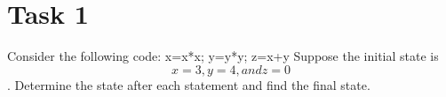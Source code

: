 \documentclass{assignment}
\begin{document}


\section*{Task 1}
Consider the following code:
x=x*x; y=y*y; z=x+y
Suppose the initial state is \[x = 3, y = 4, and z = 0\]. Determine the state after each statement and find the final state.
\end{document}
